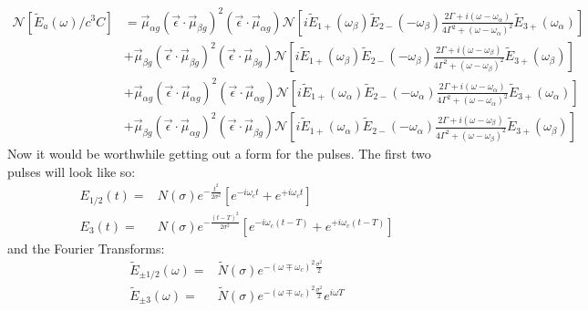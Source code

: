 \begin{align*}
	\mathcal{N} \left[\tilde{E}_a (\omega) / c^3 C\right] &= \vec{\mu}_{\alpha g} \left( \vec{\epsilon} \cdot \vec{\mu}_{\beta g} \right)^2 \left( \vec{\epsilon} \cdot \vec{\mu}_{\alpha g} \right) \mathcal{N} \left[ i  \tilde{E}_{1+} \left( \omega_{\beta} \right) \tilde{E}_{2-} \left( -\omega_{\beta} \right)    \frac{2 \Gamma + i \left( \omega - \omega_{\alpha}\right)}{4 \Gamma^2 +  \left( \omega - \omega_{\alpha}\right)^2}\tilde{E}_{3+} \left( \omega_{\alpha} \right)   \right] \\
	&+  \vec{\mu}_{\beta g} \left( \vec{\epsilon} \cdot \vec{\mu}_{\beta g} \right)^2 \left( \vec{\epsilon} \cdot \vec{\mu}_{\beta g} \right) \mathcal{N} \left[i   \tilde{E}_{1+} \left( \omega_{\beta} \right) \tilde{E}_{2-} \left( -\omega_{\beta} \right)    \frac{2 \Gamma + i \left( \omega - \omega_{\beta}\right)}{4 \Gamma^2 +  \left( \omega - \omega_{\beta}\right)^2}\tilde{E}_{3+} \left( \omega_{\beta} \right)   \right] \\
	&+  \vec{\mu}_{\alpha g} \left( \vec{\epsilon} \cdot \vec{\mu}_{\alpha g} \right)^2 \left( \vec{\epsilon} \cdot \vec{\mu}_{\alpha g} \right) \mathcal{N} \left[  i \tilde{E}_{1+} \left( \omega_{\alpha} \right) \tilde{E}_{2-} \left( -\omega_{\alpha} \right)    \frac{2 \Gamma + i \left( \omega - \omega_{\alpha}\right)}{4 \Gamma^2 +  \left( \omega - \omega_{\alpha}\right)^2}\tilde{E}_{3+} \left( \omega_{\alpha} \right)   \right] \\
	&+  \vec{\mu}_{\beta g} \left( \vec{\epsilon} \cdot \vec{\mu}_{\alpha g} \right)^2 \left( \vec{\epsilon} \cdot \vec{\mu}_{\beta g} \right) \mathcal{N} \left[ i  \tilde{E}_{1+} \left( \omega_{\alpha} \right) \tilde{E}_{2-} \left( -\omega_{\alpha} \right)    \frac{2 \Gamma + i \left( \omega - \omega_{\beta}\right)}{4 \Gamma^2 +  \left( \omega - \omega_{\beta}\right)^2}\tilde{E}_{3+} \left( \omega_{\beta} \right)   \right]
\end{align*}
Now it would be worthwhile getting out a form for the pulses.  The first two pulses will look like so:
\begin{align*}
	E_{1/2} (t) =& N (\sigma) e^{-\frac{t^2}{2 \sigma^2}} \left[  e^{- i \omega_c t} + e^{+ i \omega_c t}\right] \\
	E_{3} (t) =& N (\sigma) e^{-\frac{(t-T)^2}{2 \sigma^2}} \left[  e^{- i \omega_c (t-T)} + e^{+ i \omega_c (t-T)}\right]
\end{align*}
and the Fourier Transforms:
\begin{align*}
	\tilde{E}_{\pm1/2} (\omega) =& \tilde{N} (\sigma) e^{-(\omega \mp \omega_c)^2 \frac{\sigma^2 }{2 }  }  \\
	\tilde{E}_{\pm 3} (\omega) =& \tilde{N} (\sigma) e^{-(\omega \mp \omega_c)^2 \frac{\sigma^2 }{2 }  } e^{i \omega T}
\end{align*}
